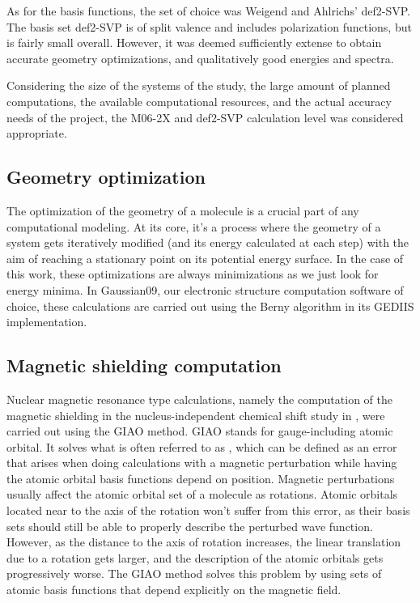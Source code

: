 As for the basis functions, the set of choice was Weigend and Ahlrichs' def2-SVP.
The basis set def2-SVP is of split valence and includes polarization functions, but is fairly small overall.
However, it was deemed sufficiently extense to obtain accurate geometry optimizations, and qualitatively good energies and spectra.

Considering the size of the systems of the study, the large amount of planned computations, the available computational resources, and the actual accuracy needs of the project, the M06-2X and def2-SVP calculation level was considered appropriate.

\subsection{Geometry optimization}
The optimization of the geometry of a molecule is a crucial part of any computational modeling.
At its core, it's a process where the geometry of a system gets iteratively modified (and its energy calculated at each step) with the aim of reaching a stationary point on its potential energy surface.
In the case of this work, these optimizations are always minimizations as we just look for energy minima.
In Gaussian09,\cite{gaussian09} our electronic structure computation software of choice, these calculations are carried out using the Berny algorithm in its GEDIIS implementation.

\subsection{Magnetic shielding computation}
Nuclear magnetic resonance type calculations, namely the computation of the magnetic shielding in the nucleus-independent chemical shift study in , were carried out using the GIAO method.
GIAO stands for gauge-including atomic orbital.
It solves what is often referred to as , which can be defined as an error that arises when doing calculations with a magnetic perturbation while having the atomic orbital basis functions depend on position.
Magnetic perturbations usually affect the atomic orbital set of a molecule as rotations.
Atomic orbitals located near to the axis of the rotation won't suffer from this error, as their basis sets should still be able to properly describe the perturbed wave function.
However, as the distance to the axis of rotation increases, the linear translation due to a rotation gets larger, and the description of the atomic orbitals gets progressively worse.
The GIAO method solves this problem by using sets of atomic basis functions that depend explicitly on the magnetic field.

